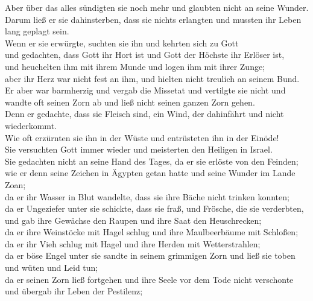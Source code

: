  Aber über das alles sündigten sie noch mehr und glaubten
nicht an seine Wunder.\\
 Darum ließ er sie dahinsterben, dass sie nichts
erlangten und mussten ihr Leben lang geplagt sein.\\
 Wenn er sie erwürgte, suchten sie ihn und kehrten sich
zu Gott\\
 und gedachten, dass Gott ihr Hort ist und Gott der
Höchste ihr Erlöser ist,\\
 und heuchelten ihm mit ihrem Munde und logen ihm mit
ihrer Zunge;\\
 aber ihr Herz war nicht fest an ihm, und hielten nicht
treulich an seinem Bund.\\
 Er aber war barmherzig und vergab die Missetat und
vertilgte sie nicht und wandte oft seinen Zorn ab und ließ nicht seinen
ganzen Zorn gehen.\\
 Denn er gedachte, dass sie Fleisch sind, ein Wind, der
dahinfährt und nicht wiederkommt.\\
 Wie oft erzürnten sie ihn in der Wüste und entrüsteten
ihn in der Einöde!\\
 Sie versuchten Gott immer wieder und meisterten den
Heiligen in Israel.\\
 Sie gedachten nicht an seine Hand des Tages, da er sie
erlöste von den Feinden;\\
 wie er denn seine Zeichen in Ägypten getan hatte und
seine Wunder im Lande Zoan;\\
 da er ihr Wasser in Blut wandelte, dass sie ihre Bäche
nicht trinken konnten;\\
 da er Ungeziefer unter sie schickte, dass sie fraß, und
Frösche, die sie verderbten,\\
 und gab ihre Gewächse den Raupen und ihre Saat den
Heuschrecken;\\
 da er ihre Weinstöcke mit Hagel schlug und ihre
Maulbeerbäume mit Schloßen;\\
 da er ihr Vieh schlug mit Hagel und ihre Herden mit
Wetterstrahlen;\\
 da er böse Engel unter sie sandte in seinem grimmigen
Zorn und ließ sie toben und wüten und Leid tun;\\
 da er seinen Zorn ließ fortgehen und ihre Seele vor dem
Tode nicht verschonte und übergab ihr Leben der Pestilenz;\\
